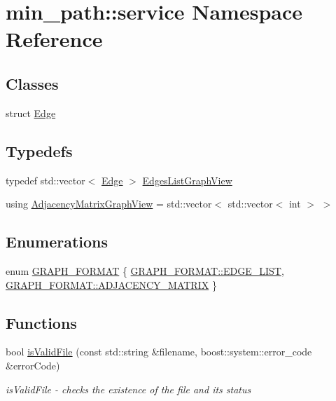 \hypertarget{namespacemin__path_1_1service}{}\section{min\+\_\+path\+:\+:service Namespace Reference}
\label{namespacemin__path_1_1service}
\subsection*{Classes}
\begin{DoxyCompactItemize}
\item 
struct \hyperlink{structmin__path_1_1service_1_1_edge}{Edge}
\end{DoxyCompactItemize}
\subsection*{Typedefs}
\begin{DoxyCompactItemize}
\item 
typedef std\+::vector$<$ \hyperlink{structmin__path_1_1service_1_1_edge}{Edge} $>$ \hyperlink{namespacemin__path_1_1service_aa7134896d837083f384364b56a32bb49}{Edges\+List\+Graph\+View}
\item 
using \hyperlink{namespacemin__path_1_1service_af657481a4b0a05546de6e9c1023bd9f5}{Adjacency\+Matrix\+Graph\+View} = std\+::vector$<$ std\+::vector$<$ int $>$ $>$
\end{DoxyCompactItemize}
\subsection*{Enumerations}
\begin{DoxyCompactItemize}
\item 
enum \hyperlink{namespacemin__path_1_1service_a1f61bb8d119aded91f38ff564193177c}{G\+R\+A\+P\+H\+\_\+\+F\+O\+R\+M\+AT} \{ \hyperlink{namespacemin__path_1_1service_a1f61bb8d119aded91f38ff564193177ca561011d4221028551bdb4a4fdf37b7e2}{G\+R\+A\+P\+H\+\_\+\+F\+O\+R\+M\+A\+T\+::\+E\+D\+G\+E\+\_\+\+L\+I\+ST}, 
\hyperlink{namespacemin__path_1_1service_a1f61bb8d119aded91f38ff564193177ca9d8e68c3898f769422174fed0be93fd2}{G\+R\+A\+P\+H\+\_\+\+F\+O\+R\+M\+A\+T\+::\+A\+D\+J\+A\+C\+E\+N\+C\+Y\+\_\+\+M\+A\+T\+R\+IX}
 \}
\end{DoxyCompactItemize}
\subsection*{Functions}
\begin{DoxyCompactItemize}
\item 
bool \hyperlink{namespacemin__path_1_1service_a57c94e914d9aaa3af892f8a74f8b23a6}{is\+Valid\+File} (const std\+::string \&filename, boost\+::system\+::error\+\_\+code \&error\+Code)
\begin{DoxyCompactList}\small\item\em is\+Valid\+File -\/ checks the existence of the file and its status \end{DoxyCompactList}\end{DoxyCompactItemize}


